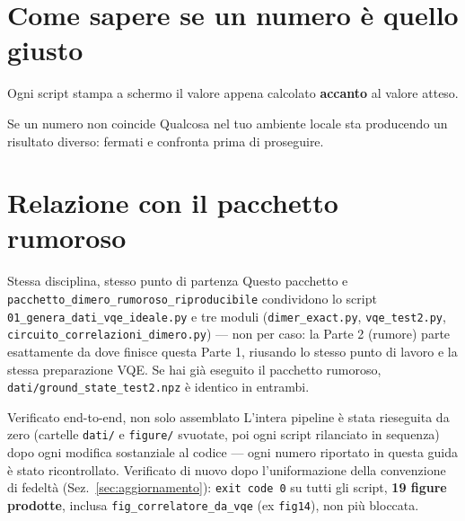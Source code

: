 \documentclass[11pt,a4paper]{article}
\newcommand{\code}[1]{\texttt{\small #1}}
\begin{document}
\section{Come sapere se un numero è quello giusto}

Ogni script stampa a schermo il valore appena calcolato \textbf{accanto}
al valore atteso.

\begin{warnbox}{Se un numero non coincide}
Qualcosa nel tuo ambiente locale sta producendo un risultato diverso:
fermati e confronta prima di proseguire.
\end{warnbox}

\section{Relazione con il pacchetto rumoroso}

\begin{okbox}{Stessa disciplina, stesso punto di partenza}
Questo pacchetto e \code{pacchetto\_dimero\_rumoroso\_riproducibile}
condividono lo script \code{01\_genera\_dati\_vqe\_ideale.py} e tre
moduli (\code{dimer\_exact.py}, \code{vqe\_test2.py},
\code{circuito\_correlazioni\_dimero.py}) --- non per caso: la Parte 2
(rumore) parte esattamente da dove finisce questa Parte 1, riusando lo
stesso punto di lavoro e la stessa preparazione VQE. Se hai già
eseguito il pacchetto rumoroso, \code{dati/ground\_state\_test2.npz} è
identico in entrambi.
\end{okbox}

\begin{okbox}{Verificato end-to-end, non solo assemblato}
L'intera pipeline è stata rieseguita da zero (cartelle \code{dati/} e
\code{figure/} svuotate, poi ogni script rilanciato in sequenza) dopo
ogni modifica sostanziale al codice --- ogni numero riportato in questa
guida è stato ricontrollato. Verificato di nuovo dopo l'uniformazione
della convenzione di fedeltà (Sez.~\ref{sec:aggiornamento}):
\code{exit code 0} su tutti gli script, \textbf{19 figure prodotte},
inclusa \code{fig\_correlatore\_da\_vqe} (ex \code{fig14}), non più
bloccata.
\end{okbox}
\end{document}
